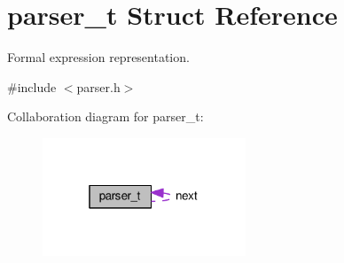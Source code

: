 \hypertarget{structparser__t}{}\section{parser\+\_\+t Struct Reference}
\label{structparser__t}


Formal expression representation.  




{\ttfamily \#include $<$parser.\+h$>$}



Collaboration diagram for parser\+\_\+t\+:\nopagebreak
\begin{figure}[H]
\begin{center}
\leavevmode
\includegraphics[width=172pt]{structparser__t__coll__graph}
\end{center}
\end{figure}
